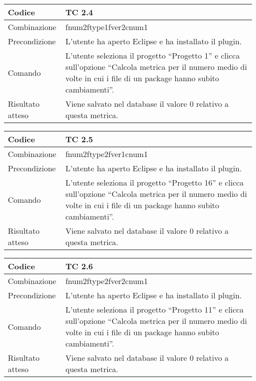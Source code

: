 \begin{table}[ht]
\begin{tabular}{|p{3cm}|p{9cm}|}
\hline
\cellcolor{lightgray}Codice				& TC 2.4								\\
\hline
\cellcolor{lightgray}Combinazione		& fnum2ftype1fver2cnum1									\\
\hline
\cellcolor{lightgray}Precondizione		& L'utente ha aperto Eclipse e ha installato il plugin.		\\
\hline
\cellcolor{lightgray}Comando			& L'utente seleziona il progetto ``Progetto 1''  e clicca sull'opzione ``Calcola metrica per il numero medio di volte in cui i file di un package hanno subito cambiamenti''.	\\
\hline
\cellcolor{lightgray}Risultato atteso	& Viene salvato nel database il valore 0 relativo a questa metrica.\\
\hline
\end{tabular}
\end{table}

\begin{table}[ht]
\begin{tabular}{|p{3cm}|p{9cm}|}
\hline
\cellcolor{lightgray}Codice				& TC 2.5								\\
\hline
\cellcolor{lightgray}Combinazione		& fnum2ftype2fver1cnum1								\\
\hline
\cellcolor{lightgray}Precondizione		& L'utente ha aperto Eclipse e ha installato il plugin.		\\
\hline
\cellcolor{lightgray}Comando			& L'utente seleziona il progetto ``Progetto 16''  e clicca sull'opzione ``Calcola metrica per il numero medio di volte in cui i file di un package hanno subito cambiamenti''.	\\
\hline
\cellcolor{lightgray}Risultato atteso	& Viene salvato nel database il valore 0 relativo a questa metrica.\\
\hline
\end{tabular}
\end{table}

\begin{table}[ht]
\begin{tabular}{|p{3cm}|p{9cm}|}
\hline
\cellcolor{lightgray}Codice				& TC 2.6								\\
\hline
\cellcolor{lightgray}Combinazione		& fnum2ftype2fver2cnum1								\\
\hline
\cellcolor{lightgray}Precondizione		& L'utente ha aperto Eclipse e ha installato il plugin.		\\
\hline
\cellcolor{lightgray}Comando			& L'utente seleziona il progetto ``Progetto 11''  e clicca sull'opzione ``Calcola metrica per il numero medio di volte in cui i file di un package hanno subito cambiamenti''.	\\
\hline
\cellcolor{lightgray}Risultato atteso	& Viene salvato nel database il valore 0 relativo a questa metrica.\\
\hline
\end{tabular}
\end{table}

